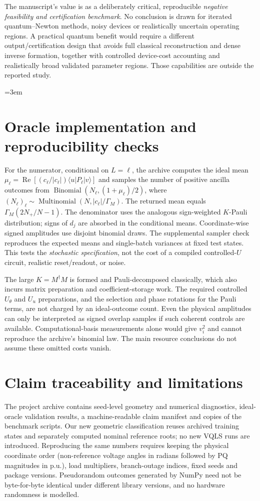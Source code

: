 \documentclass[11pt,a4paper]{article}
\theoremstyle{remark}\newtheorem{remark}[theorem]{Remark}
\begin{document}
The manuscript's value is as a deliberately critical, reproducible \emph{negative feasibility and certification benchmark}. No conclusion is drawn for iterated quantum--Newton methods, noisy devices or realistically uncertain operating regions. A practical quantum benefit would require a different output/certification design that avoids full classical reconstruction and dense inverse formation, together with controlled device-cost accounting and realistically broad validated parameter regions. Those capabilities are outside the reported study.

\appendix
\emergencystretch=3em
\section{Oracle implementation and reproducibility checks}\label{app:oracle}
For the numerator, conditional on $L=\ell$, the archive computes the ideal mean $\mu_\ell=\operatorname{Re}[(c_\ell/|c_\ell|)\langle u|P_\ell|v\rangle]$ and samples the number of positive ancilla outcomes from $\operatorname{Binomial}(N_\ell,(1+\mu_\ell)/2)$, where $(N_\ell)_\ell\sim\operatorname{Multinomial}(N,|c_\ell|/\Gamma_M)$. The returned mean equals $\Gamma_M(2N_+/N-1)$. The denominator uses the analogous sign-weighted $K$-Pauli distribution; signs of $d_j$ are absorbed in the conditional means. Coordinate-wise signed amplitudes use disjoint binomial draws. The supplemental sampler check reproduces the expected means and single-batch variances at fixed test states. This tests the \emph{stochastic specification}, not the cost of a compiled controlled-$U$ circuit, realistic reset/readout, or noise.

The large $K=M^\dagger M$ is formed and Pauli-decomposed classically, which also incurs matrix preparation and coefficient-storage work. The required controlled $U_\theta$ and $U_u$ preparations, and the selection and phase rotations for the Pauli terms, are not charged by an ideal-outcome count. Even the physical amplitudes can only be interpreted as signed overlap samples if such coherent controls are available. Computational-basis measurements alone would give $v_i^2$ and cannot reproduce the archive's binomial law. The main resource conclusions do not assume these omitted costs vanish.

\section{Claim traceability and limitations}\label{app:trace}
The project archive contains seed-level geometry and numerical diagnostics, ideal-oracle validation results, a machine-readable claim manifest and copies of the benchmark scripts. Our new geometric classification reuses archived training states and separately computed nominal reference roots; no new VQLS runs are introduced. Reproducing the same numbers requires keeping the physical coordinate order (non-reference voltage angles in radians followed by PQ magnitudes in p.u.), load multipliers, branch-outage indices, fixed seeds and package versions. Pseudorandom outcomes generated by NumPy need not be byte-for-byte identical under different library versions, and no hardware randomness is modelled.
\end{document}
